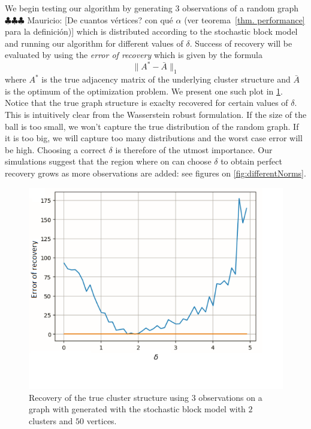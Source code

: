\documentclass[12pt]{amsart}
\theoremstyle{remark}
\newcommand{\mv}[1]{{\color{red} \sf $\clubsuit\clubsuit\clubsuit$ Mauricio: [#1]}}
\begin{document}
We begin testing our algorithm by generating $3$ observations of a random graph \mv{De cuantos v\'ertices? con qu\'e $\alpha$ (ver teorema~\ref{thm. performance} para la definici\'on)} which is distributed according to the stochastic block model and running our algorithm for different values of $\delta$. Success of recovery will be evaluated by using the \textit{error of recovery}  which is given by the formula
\[\|A^*-\bar{A}\|_1\]
where $A^*$ is the true adjacency matrix of the underlying cluster structure and $\bar{A}$ is the optimum of the optimization problem.
We present one such plot in \ref{fig:errorRecovery}. Notice that the true graph structure is exaclty recovered for certain values of $\delta$.
This is intuitively clear from the Wasserstein robust formulation. If the size of the ball is too small, we won't capture the true distribution of the random graph. If it is too big, we will capture too many distributions and the worst case error will be high.
Choosing a correct $\delta$ is therefore of the utmost importance. Our simulations suggest that the region where on can choose $\delta$ to obtain perfect recovery grows as more observations are added: see figures on \ref{fig:differentNorms}.
\begin{figure}[h]
\centering
\includegraphics[width=1\textwidth]{./Pictures/ErrorRecovery.PNG}
\caption{Recovery of the true cluster structure using $3$ observations on a graph with generated with the stochastic block model with $2$ clusters and $50$ vertices.}
 \label{fig:errorRecovery}
\end{figure}
\end{document}
